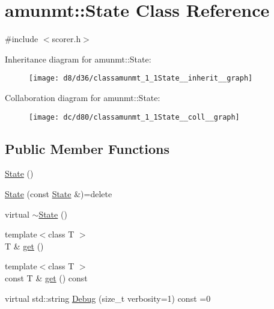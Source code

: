 \hypertarget{classamunmt_1_1State}{}\section{amunmt\+:\+:State Class Reference}
\label{classamunmt_1_1State}


{\ttfamily \#include $<$scorer.\+h$>$}



Inheritance diagram for amunmt\+:\+:State\+:
\nopagebreak
\begin{figure}[H]
\begin{center}
\leavevmode
\texttt{[image: d8/d36/classamunmt\_1\_1State\_\_inherit\_\_graph]}
\end{center}
\end{figure}


Collaboration diagram for amunmt\+:\+:State\+:
\nopagebreak
\begin{figure}[H]
\begin{center}
\leavevmode
\texttt{[image: dc/d80/classamunmt\_1\_1State\_\_coll\_\_graph]}
\end{center}
\end{figure}
\subsection*{Public Member Functions}
\begin{DoxyCompactItemize}
\item 
\hyperlink{classamunmt_1_1State_ab7f941d1593c857c03343366771aea60}{State} ()
\item 
\hyperlink{classamunmt_1_1State_a5c9537bf577c1ba8864cd14464a44d4f}{State} (const \hyperlink{classamunmt_1_1State}{State} \&)=delete
\item 
virtual \hyperlink{classamunmt_1_1State_aa1b69b8a6325bf5848413127dfa7b72b}{$\sim$\+State} ()
\item 
{\footnotesize template$<$class T $>$ }\\T \& \hyperlink{classamunmt_1_1State_a748a6dd71c6bc8b3aba0d2c85aa9e147}{get} ()
\item 
{\footnotesize template$<$class T $>$ }\\const T \& \hyperlink{classamunmt_1_1State_a84be8238cee2af984eb32192b633074d}{get} () const 
\item 
virtual std\+::string \hyperlink{classamunmt_1_1State_adb04a08cfc5f0aa9dc7a3e652b011f71}{Debug} (size\+\_\+t verbosity=1) const =0
\end{DoxyCompactItemize}



